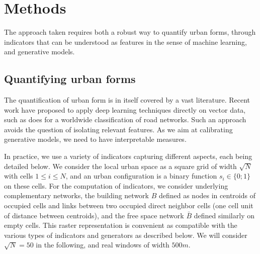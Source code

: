 \documentclass[letterpaper]{article}
\begin{document}
\section{Methods} \label{sec:methods}

The approach taken requires both a robust way to quantify urban forms, through indicators that can be understood as features in the sense of machine learning, and generative models.

\subsection{Quantifying urban forms}


The quantification of urban form is in itself covered by a vast literature. Recent work have proposed to apply deep learning techniques directly on vector data, such as \cite{2017arXiv170902939M} does for a worldwide classification of road networks. Such an approach avoids the question of isolating relevant features. As we aim at calibrating generative models, we need to have interpretable measures.

\citep{webster1995urban}


\cite{boeing2018measuring} %
\cite{fumega2014identification} %
\cite{rode2014cities} %


In practice, we use a variety of indicators capturing different aspects, each being detailed below. We consider the local urban space as a square grid of width $\sqrt{N}$ with cells $1 \leq i \leq N$, and an urban configuration is a binary function $s_i \in \{0;1\}$ on these cells. For the computation of indicators, we consider underlying complementary networks, the building network $B$ defined as nodes in centroids of occupied cells and links between two occupied direct neighbor cells (one cell unit of distance between centroids), and the free space network $\bar{B}$ defined similarly on empty cells. This raster representation is convenient as compatible with the various types of indicators and generators as described below. We will consider $\sqrt{N}=50$ in the following, and real windows of width $500m$.
\end{document}
